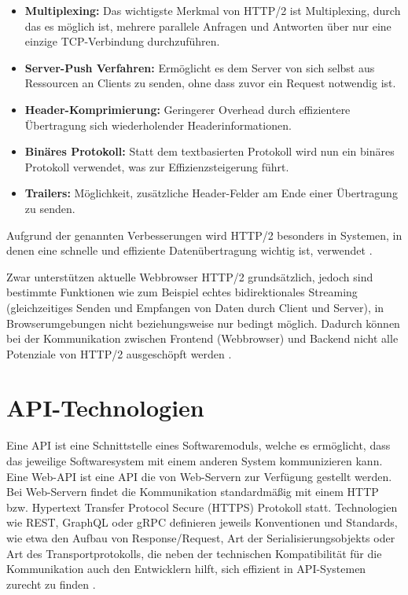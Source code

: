 \begin{itemize}
	\item \textbf{Multiplexing:} Das wichtigste Merkmal von HTTP/2 ist Multiplexing, durch das es möglich ist, mehrere parallele Anfragen und Antworten über nur eine einzige TCP-Verbindung durchzuführen.
	\item \textbf{Server-Push Verfahren:} Ermöglicht es dem Server von sich selbst aus Ressourcen an Clients zu senden, ohne dass zuvor ein Request notwendig ist.
	\item \textbf{Header-Komprimierung:} Geringerer Overhead durch effizientere Übertragung sich wiederholender Headerinformationen.
	\item \textbf{Binäres Protokoll:} Statt dem textbasierten Protokoll wird nun ein binäres Protokoll verwendet, was zur Effizienzsteigerung führt.
	\item \textbf{Trailers:} Möglichkeit, zusätzliche Header-Felder am Ende einer Übertragung zu senden.
\end{itemize}

Aufgrund der genannten Verbesserungen wird HTTP/2 besonders in Systemen, in denen eine schnelle und effiziente Datenübertragung wichtig ist, verwendet \parencite{rfc9113}.

Zwar unterstützen aktuelle Webbrowser HTTP/2 grundsätzlich, jedoch sind bestimmte Funktionen wie zum Beispiel echtes bidirektionales Streaming (gleichzeitiges Senden und Empfangen von Daten durch Client und Server), in Browserumgebungen nicht beziehungsweise nur bedingt möglich. Dadurch können bei der Kommunikation zwischen Frontend (Webbrowser) und Backend nicht alle Potenziale von HTTP/2 ausgeschöpft werden \parencite{aspnet-grpcweb}.

\section{API-Technologien}
Eine API ist eine Schnittstelle eines Softwaremoduls, welche es ermöglicht, dass das jeweilige Softwaresystem mit einem anderen System kommunizieren kann.
Eine Web-API ist eine API die von Web-Servern zur Verfügung gestellt werden. Bei Web-Servern findet die Kommunikation standardmäßig mit einem HTTP bzw. Hypertext Transfer Protocol Secure (HTTPS) Protokoll statt. 
Technologien wie REST, GraphQL oder gRPC definieren jeweils Konventionen und Standards, wie etwa den Aufbau von Response/Request, Art der Serialisierungsobjekts oder Art des Transportprotokolls, die neben der technischen Kompatibilität für die Kommunikation auch den Entwicklern hilft, sich effizient in API-Systemen zurecht zu finden
 \parencite{redhat-apiguide}.

